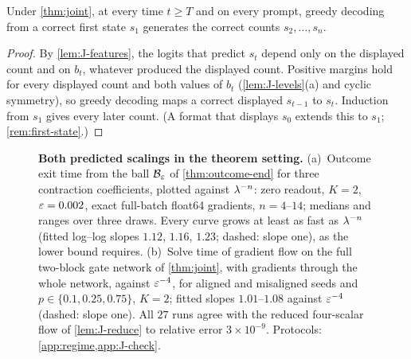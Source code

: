 \begin{corollary}
\label{cor:free-running}
Under \cref{thm:joint}, at every time $t\ge T$ and on every prompt, greedy decoding from a correct first state $s_1$ generates the correct
counts $s_2,\ldots,s_n$.
\end{corollary}
\begin{proof}
By \cref{lem:J-features}, the logits that predict $s_t$ depend only on the displayed count and on $b_t$, whatever produced the displayed
count. Positive margins hold for every displayed count and both values of $b_t$ (\cref{lem:J-levels}(a) and cyclic symmetry), so greedy
decoding maps a correct displayed $s_{t-1}$ to $s_t$. Induction from $s_1$ gives every later count. (A format that displays $s_0$
extends this to $s_1$; \cref{rem:first-state}.)
\end{proof}

\begin{figure}[t]
\centering
\resizebox{\linewidth}{!}{}
\caption{\textbf{Both predicted scalings in the theorem setting.}
(a)~Outcome exit time from the ball $\mathcal B_{\varepsilon}$ of \cref{thm:outcome-end} for three contraction coefficients, plotted against $\lambda^{-n}$:
zero readout, $K=2$, $\varepsilon=0.002$, exact full-batch float64 gradients, $n=4$--$14$; medians and ranges over three draws. Every curve grows at least as fast as $\lambda^{-n}$
(fitted log--log slopes $1.12$, $1.16$, $1.23$; dashed: slope one), as the lower bound requires. (b)~Solve time of gradient flow on the full two-block gate network of \cref{thm:joint}, with gradients through the whole network,
against $\varepsilon^{-4}$, for aligned and misaligned seeds and $p\in\{0.1,0.25,0.75\}$, $K=2$; fitted slopes $1.01$--$1.08$ against $\varepsilon^{-4}$ (dashed: slope one). All $27$ runs
agree with the reduced four-scalar flow of \cref{lem:J-reduce} to relative error $3\times10^{-9}$.
Protocols: \cref{app:regime,app:J-check}.}
\label{fig:scaling}
\end{figure}

\noindent{}

